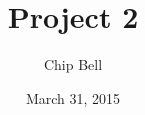 \documentclass[a4paper,12pt]{article}
\begin{document}
\title{Project 2}
\author{Chip Bell}
\date{March 31, 2015}
\maketitle

\cite{pubsub}



\end{document}
